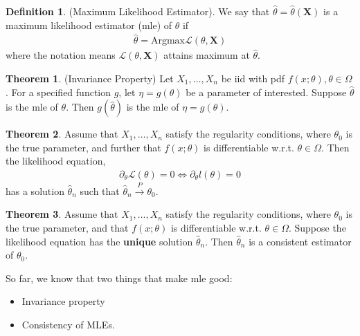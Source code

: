 \documentclass{book}
\theoremstyle{definition}
\newtheorem{defn}{Definition}[section]
\newtheorem{thm}{Theorem}[section]
\newcommand{\p}{\partial}
\newcommand{\lag}{\mathcal{L}}
\begin{document}
\begin{defn}
	(Maximum Likelihood Estimator). We say that $\hat\theta = \hat\theta(\mathbf{X})$ is a maximum likelihood estimator (mle) of $\theta$ if 
	\begin{align}
	\hat\theta = \text{Argmax} \lag(\theta,\mathbf{X})
	\end{align}
	where the notation means $\lag(\theta, \mathbf{X})$ attains maximum at $\hat\theta$. 
\end{defn}



\begin{thm}
	(Invariance Property) Let $X_1,\dots, X_n$ be iid with pdf $f(x;\theta),\theta \in \Omega$. For a specified function $g$, let $\eta = g(\theta)$ be a parameter of interested. Suppose $\hat\theta$ is the mle of $\theta$. Then $g(\hat\theta)$ is the mle of $\eta = g(\theta)$. 
\end{thm}



\begin{thm}
	Assume that $X_1,\dots,X_n$ satisfy the regularity conditions, where $\theta_0$ is the true parameter, and further that $f(x;\theta)$ is differentiable w.r.t. $\theta \in \Omega$. Then the likelihood equation,
	\begin{align}
	\p_\theta \lag(\theta) = 0 \iff  \p_\theta l(\theta) = 0
	\end{align}
	has a solution $\hat\theta_n$ such that $\hat\theta_n \xrightarrow{P} \theta_0$.
\end{thm}




\begin{thm}
	Assume that $X_1,\dots,X_n$ satisfy the regularity conditions, where $\theta_0$ is the true parameter, and that $f(x;\theta)$ is differentiable w.r.t. $\theta \in \Omega$. Suppose the likelihood equation has the \textbf{unique} solution $\hat\theta_n$. Then $\hat\theta_n$ is a consistent estimator of $\theta_0$.
\end{thm}



So far, we know that two things that make mle good:
\begin{itemize}
	\item Invariance property
	\item Consistency of MLEs.
\end{itemize}
\end{document}
